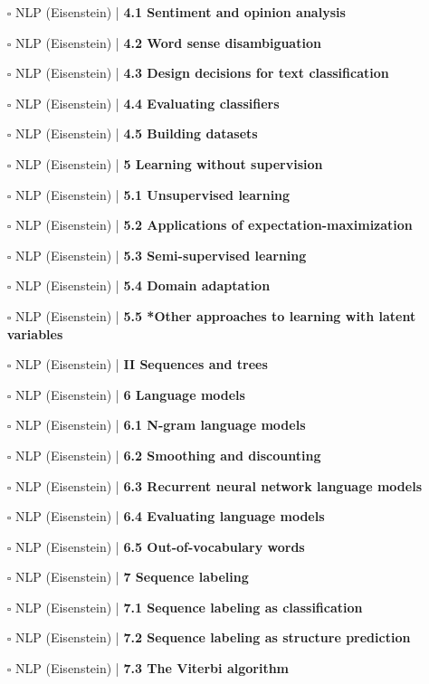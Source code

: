 \documentclass[a4, landscape, 12pt]{article}
\newcommand{\checkbox}{$\square$}%
\begin{document}
\begin{itemize}
{}
\item [\checkbox]  NLP (Eisenstein) | \textbf{ 4.1 Sentiment and opinion analysis
}
\item [\checkbox]  NLP (Eisenstein) | \textbf{ 4.2 Word sense disambiguation
}
\item [\checkbox]  NLP (Eisenstein) | \textbf{ 4.3 Design decisions for text classification
}
\item [\checkbox]  NLP (Eisenstein) | \textbf{ 4.4 Evaluating classifiers
}
\item [\checkbox]  NLP (Eisenstein) | \textbf{ 4.5 Building datasets
}
\item [\checkbox]  NLP (Eisenstein) | \textbf{ 5 Learning without supervision
}
\item [\checkbox]  NLP (Eisenstein) | \textbf{ 5.1 Unsupervised learning
}
\item [\checkbox]  NLP (Eisenstein) | \textbf{ 5.2 Applications of expectation-maximization
}
\item [\checkbox]  NLP (Eisenstein) | \textbf{ 5.3 Semi-supervised learning
}
\item [\checkbox]  NLP (Eisenstein) | \textbf{ 5.4 Domain adaptation
}
\item [\checkbox]  NLP (Eisenstein) | \textbf{ 5.5 *Other approaches to learning with latent variables
}
\item [\checkbox]  NLP (Eisenstein) | \textbf{ II Sequences and trees
}
\item [\checkbox]  NLP (Eisenstein) | \textbf{ 6 Language models
}
\item [\checkbox]  NLP (Eisenstein) | \textbf{ 6.1 N-gram language models
}
\item [\checkbox]  NLP (Eisenstein) | \textbf{ 6.2 Smoothing and discounting
}
\item [\checkbox]  NLP (Eisenstein) | \textbf{ 6.3 Recurrent neural network language models
}
\item [\checkbox]  NLP (Eisenstein) | \textbf{ 6.4 Evaluating language models
}
\item [\checkbox]  NLP (Eisenstein) | \textbf{ 6.5 Out-of-vocabulary words
}
\item [\checkbox]  NLP (Eisenstein) | \textbf{ 7 Sequence labeling
}
\item [\checkbox]  NLP (Eisenstein) | \textbf{ 7.1 Sequence labeling as classification
}
\item [\checkbox]  NLP (Eisenstein) | \textbf{ 7.2 Sequence labeling as structure prediction
}
\item [\checkbox]  NLP (Eisenstein) | \textbf{ 7.3 The Viterbi algorithm
}
\end{itemize}
\end{document}

